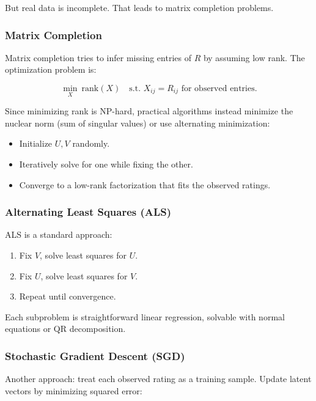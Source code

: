 \documentclass[
  letterpaper,
  DIV=11,
  numbers=noendperiod]{scrreprt}
\providecommand{\tightlist}{%
  \setlength{\itemsep}{0pt}\setlength{\parskip}{0pt}}
\begin{document}
But real data is incomplete. That leads to matrix completion problems.

\subsubsection{Matrix Completion}\label{matrix-completion}

Matrix completion tries to infer missing entries of \(R\) by assuming
low rank. The optimization problem is:

\[
\min_{X} \ \text{rank}(X) \quad \text{s.t. } X_{ij} = R_{ij} \text{ for observed entries}.
\]

Since minimizing rank is NP-hard, practical algorithms instead minimize
the nuclear norm (sum of singular values) or use alternating
minimization:

\begin{itemize}
\tightlist
\item
  Initialize \(U, V\) randomly.
\item
  Iteratively solve for one while fixing the other.
\item
  Converge to a low-rank factorization that fits the observed ratings.
\end{itemize}

\subsubsection{Alternating Least Squares
(ALS)}\label{alternating-least-squares-als}

ALS is a standard approach:

\begin{enumerate}
\def\labelenumi{\arabic{enumi}.}
\tightlist
\item
  Fix \(V\), solve least squares for \(U\).
\item
  Fix \(U\), solve least squares for \(V\).
\item
  Repeat until convergence.
\end{enumerate}

Each subproblem is straightforward linear regression, solvable with
normal equations or QR decomposition.

\subsubsection{Stochastic Gradient Descent
(SGD)}\label{stochastic-gradient-descent-sgd}

Another approach: treat each observed rating as a training sample.
Update latent vectors by minimizing squared error:
\end{document}
